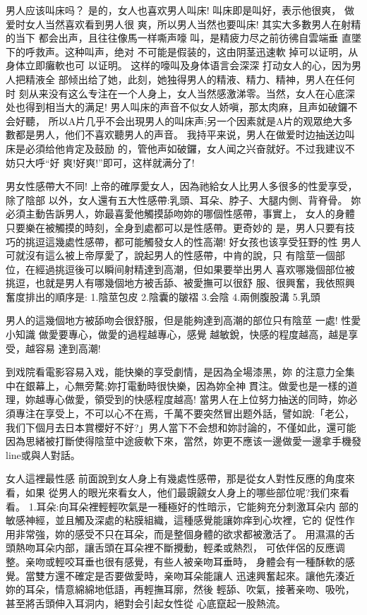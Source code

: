 \documentclass[12pt,UTF8]{ctexbook}
\begin{document}
男人应该叫床吗？
是的，女人也喜欢男人叫床!
叫床即是叫好，表示他很爽，
做爱时女人当然喜欢看到男人很
爽，所以男人当然也要叫床!
其实大多數男人在射精的当下
都会出声，且往往像馬一样嘶声嚎
叫，是精疲力尽之前彷彿自雲端垂
直墜下的呼救声。这种叫声，绝对
不可能是假装的，这由阴茎迅速軟
掉可以证明，从身体立即癱軟也可
以证明。
这样的嚎叫及身体语言会深深
打动女人的心，因为男人把精液全
部倾出给了她，此刻，她独得男人的精液、精力、精神，男人在任何时
刻从来没有这么专注在一个人身上，女人当然感激涕零。当然，女人在心底深处也得到相当大的满足!
男人叫床的声音不似女人娇嗔，那太肉麻，且声如破鑼不会好聽，
所以A片几乎不会出現男人的叫床声;另一个因素就是A片的观眾绝大多
數都是男人，他们不喜欢聽男人的声音。
我持平来说，男人在做爱时边抽送边叫床是必須给他肯定及鼓励
的，管他声如破鑼，女人闻之兴奋就好。不过我建议不妨只大呼“好
爽!好爽!”即可，这样就满分了!

男女性感帶大不同!
上帝的確厚愛女人，因為祂給女人比男人多很多的性愛享受，除了陰部
以外，女人還有五大性感帶:乳頭、耳朵、脖子、大腿内側、背脊骨。
妳必須主動告訴男人，妳最喜愛他觸摸舔吻妳的哪個性感帶，事實上，
女人的身體只要樂在被觸摸的時刻，全身到處都可以是性感帶。更奇妙的
是，男人只要有技巧的挑逗這幾處性感帶，都可能觸發女人的性高潮!
好女孩也该享受狂野的性
男人可就沒有這么被上帝厚愛了，說起男人的性感帶，中肯的說，只
有陰莖一個部位，在經過挑逗後可以瞬间射精達到高潮，但如果要举出男人
喜欢哪幾個部位被挑逗，也就是男人有哪幾個地方被舌舔、被愛撫可以很舒
服、很興奮，我依照興奮度排出的順序是:
1.陰莖包皮
2.陰囊的皺褶
3.会陰
4.兩側腹股溝
5.乳頭

男人的這幾個地方被舔吻会很舒服，但是能夠達到高潮的部位只有陰莖
一處!
性愛小知識
做愛要專心，做愛的過程越專心，感覺
越敏銳，快感的程度越高，越是享受，越容易
達到高潮!

到戏院看電影容易入戏，能快樂的享受劇情，是因為全場漆黑，妳
的注意力全集中在銀幕上，心無旁騖;妳打電動時很快樂，因為妳全神
貫注。做愛也是一樣的道理，妳越專心做愛，領受到的快感程度越高!
當男人在上位努力抽送的同時，妳必須專注在享受上，不可以心不在焉，千萬不要突然冒出题外話，譬如說:「老公，我们下個月去日本賞櫻好不好?」男人當下不会想和妳討論的，不僅如此，還可能因為思緒被打斷使得陰莖中途疲軟下來，當然，妳更不應该一邊做愛一邊拿手機發line或與人對話。

女人這裡最性感
前面說到女人身上有幾處性感帶，那是從女人對性反應的角度來看，如果
從男人的眼光來看女人，他们最覬覦女人身上的哪些部位呢?我们來看看。
1.耳朵:向耳朵裡輕輕吹氣是一種極好的性暗示，它能夠充分刺激耳朵内
部的敏感神經，並且觸及深處的粘膜組織，這種感覺能讓妳痒到心坎裡，它的
促性作用非常強，妳的感受不只在耳朵，而是整個身體的欲求都被激活了。
用濕濕的舌頭熱吻耳朵内部，讓舌頭在耳朵裡不斷攪動，輕柔或熱烈，
可依伴侶的反應调整。亲吻或輕咬耳垂也很有感覺，有些人被亲吻耳垂時，
身體会有一種酥軟的感覺。當雙方還不確定是否要做愛時，亲吻耳朵能讓人
迅速興奮起來。讓他先湊近妳的耳朵，情意綿綿地低語，再輕撫耳廓，然後
輕舔、吹氣，接著亲吻、吸吮，甚至將舌頭伸入耳洞内，絕對会引起女性從
心底竄起一股熱流。
\end{document}
